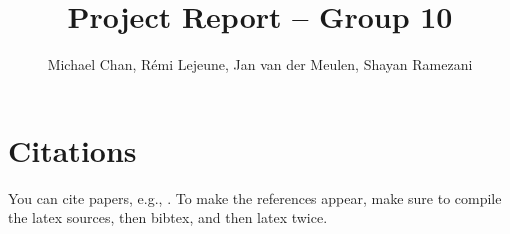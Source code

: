 \documentclass[sigconf,nonacm]{acmart}
\title{Project Report -- Group 10}
\author{Michael Chan, Rémi Lejeune, Jan van der Meulen, Shayan Ramezani}
\begin{document}

% 

\maketitle









\section{Citations}

You can cite papers, e.g., \cite{test-ref}.
To make the references appear, make sure to compile the latex sources, then bibtex, and then latex twice.


\end{document}
